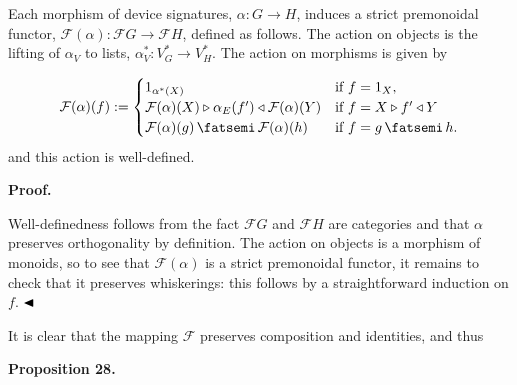 Each morphism of device signatures, $\alpha:G\to H$, induces a strict premonoidal functor, $\mathcal{F}(\alpha):\mathcal{F}G\to\mathcal{F}H$, defined as follows. The action on objects is the lifting of $\alpha_{V}$ to lists, $\alpha_{V}^{*}:V_{G}^{*}\to V_{H}^{*}$. The action on morphisms is given by\par
    \[\mathcal{F}(\alpha)(f):=\begin{cases}1_{\alpha^{*}(X)}&\text{if $f=1_{X}$},\\
\mathcal{F}(\alpha)(X)\triangleright\alpha_{E}(f^{\prime})\triangleleft\mathcal{F}(\alpha)(Y)&\text{if $f=X\triangleright f^{\prime}\triangleleft Y$}\\
\mathcal{F}(\alpha)(g)\mathop{\fatsemi}\mathcal{F}(\alpha)(h)&\text{if $f=g\mathop{\fatsemi}h$.}\\
\end{cases}\]    
and this action is well-defined.\par
 
 
 
 
 
\par\medskip\noindent\textbf{Proof.}\par
 
 
Well-definedness follows from the fact $\mathcal{F}G$ and $\mathcal{F}H$ are categories and that $\alpha$ preserves orthogonality by definition. The action on objects is a morphism of monoids, so to see that $\mathcal{F}(\alpha)$ is a strict premonoidal functor, it remains to check that it preserves whiskerings: this follows by a straightforward induction on $f$. $\hfill\blacktriangleleft$\par
 
 
 
It is clear that the mapping $\mathcal{F}$ preserves composition and identities, and thus\par
 
 
 
\par\medskip\noindent\textbf{Proposition 28.}\par
 
